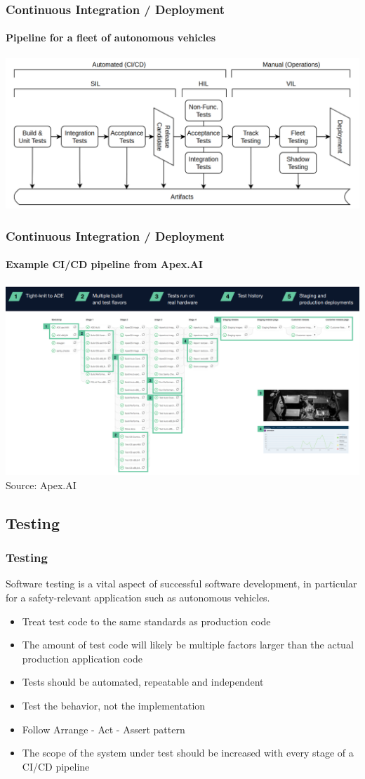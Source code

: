 \begin{frame}
\frametitle{Continuous Integration / Deployment}
\framesubtitle{Pipeline for a fleet of autonomous vehicles}
\includegraphics[width=\textwidth]{images/autonomous_driving_ci-cd_pipeline.png}
\end{frame}

\begin{frame}
\frametitle{Continuous Integration / Deployment}
\framesubtitle{Example CI/CD pipeline from Apex.AI}
\centering
\includegraphics[height=0.78\textheight]{images/apex_cicd.png}\\
\footnotesize{Source: Apex.AI}
\end{frame}

\subsection{Testing}

\begin{frame}
\frametitle{Testing}
Software testing is a vital aspect of successful software development, in
particular for a safety-relevant application such as autonomous vehicles.

\begin{itemize}
    \item Treat test code to the same standards as production code
    \item The amount of test code will likely be multiple factors larger 
        than the actual production application code
    \item Tests should be automated, repeatable and independent
    \item Test the behavior, not the implementation
    \item Follow Arrange - Act - Assert pattern
    \item The scope of the system under test should be increased with every
        stage of a CI/CD pipeline
\end{itemize}
\end{frame}

